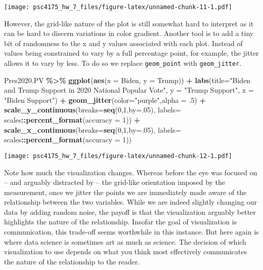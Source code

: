 \documentclass[
]{article}
\newenvironment{Shaded}{\begin{snugshade}}{\end{snugshade}}
\newcommand{\AttributeTok}[1]{\textcolor[rgb]{0.13,0.29,0.53}{#1}}
\newcommand{\DecValTok}[1]{\textcolor[rgb]{0.00,0.00,0.81}{#1}}
\newcommand{\FunctionTok}[1]{\textcolor[rgb]{0.13,0.29,0.53}{\textbf{#1}}}
\newcommand{\NormalTok}[1]{#1}
\newcommand{\SpecialCharTok}[1]{\textcolor[rgb]{0.81,0.36,0.00}{\textbf{#1}}}
\newcommand{\StringTok}[1]{\textcolor[rgb]{0.31,0.60,0.02}{#1}}
\begin{document}
\texttt{[image: psc4175\_hw\_7\_files/figure-latex/unnamed-chunk-11-1.pdf]}

However, the grid-like nature of the plot is still somewhat hard to
interpret as it can be hard to discern variations in color gradient.
Another tool is to add a tiny bit of randomness to the x and y values
associated with each plot. Instead of values being constrained to vary
by a full percentage point, for example, the jitter allows it to vary by
less. To do so we replace \texttt{geom\_point} with
\texttt{geom\_jitter}.

\begin{Shaded}
\begin{Highlighting}[]
\NormalTok{Pres2020.PV }\SpecialCharTok{\%\textgreater{}\%}
  \FunctionTok{ggplot}\NormalTok{(}\FunctionTok{aes}\NormalTok{(}\AttributeTok{x =}\NormalTok{ Biden, }\AttributeTok{y =}\NormalTok{ Trump)) }\SpecialCharTok{+} 
  \FunctionTok{labs}\NormalTok{(}\AttributeTok{title=}\StringTok{"Biden and Trump Support in 2020 National Popular Vote"}\NormalTok{,}
       \AttributeTok{y =} \StringTok{"Trump Support"}\NormalTok{,}
       \AttributeTok{x =} \StringTok{"Biden Support"}\NormalTok{) }\SpecialCharTok{+} 
  \FunctionTok{geom\_jitter}\NormalTok{(}\AttributeTok{color=}\StringTok{"purple"}\NormalTok{,}\AttributeTok{alpha =}\NormalTok{ .}\DecValTok{5}\NormalTok{) }\SpecialCharTok{+} 
    \FunctionTok{scale\_y\_continuous}\NormalTok{(}\AttributeTok{breaks=}\FunctionTok{seq}\NormalTok{(}\DecValTok{0}\NormalTok{,}\DecValTok{1}\NormalTok{,}\AttributeTok{by=}\NormalTok{.}\DecValTok{05}\NormalTok{),}
                     \AttributeTok{labels=}\NormalTok{ scales}\SpecialCharTok{::}\FunctionTok{percent\_format}\NormalTok{(}\AttributeTok{accuracy =} \DecValTok{1}\NormalTok{)) }\SpecialCharTok{+}
  \FunctionTok{scale\_x\_continuous}\NormalTok{(}\AttributeTok{breaks=}\FunctionTok{seq}\NormalTok{(}\DecValTok{0}\NormalTok{,}\DecValTok{1}\NormalTok{,}\AttributeTok{by=}\NormalTok{.}\DecValTok{05}\NormalTok{),}
                     \AttributeTok{labels=}\NormalTok{ scales}\SpecialCharTok{::}\FunctionTok{percent\_format}\NormalTok{(}\AttributeTok{accuracy =} \DecValTok{1}\NormalTok{)) }
\end{Highlighting}
\end{Shaded}

\texttt{[image: psc4175\_hw\_7\_files/figure-latex/unnamed-chunk-12-1.pdf]}

Note how much the visualization changes. Whereas before the eye was
focused on -- and arguably distracted by -- the grid-like orientation
imposed by the measurement, once we jitter the points we are immediately
made aware of the relationship between the two variables. While we are
indeed slightly changing our data by adding random noise, the payoff is
that the visualization arguably better highlights the nature of the
relationship. Insofar the goal of visualization is communication, this
trade-off seems worthwhile in this instance. But here again is where
data science is sometimes art as much as science. The decision of which
visualization to use depends on what you think most effectively
communicates the nature of the relationship to the reader.
\end{document}
